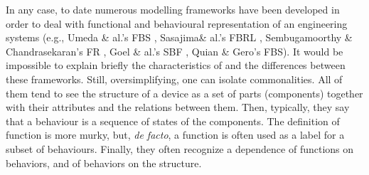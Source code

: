 \documentclass[sw]{iosart2x}
\newcommand{\TODO}[1]{{\color{red} #1}}
\begin{document}
In any case, to date numerous modelling frameworks have been developed in order to deal with functional and behavioural representation of an engineering systems (e.g., Umeda \& al.'s FBS \cite{umedaFunctionBehaviourStructure1990}, Sasajima\& al.'s FBRL \cite{sasajimaFBRLFunctionBehavior1995}, Sembugamoorthy \& Chandrasekaran's FR \cite{sembugamoorthy1986functional}, Goel \& al.'s SBF \cite{goelUseDesignPatterns2004}, Quian \& Gero's FBS).
It would be impossible to explain briefly the characteristics of and the differences between these frameworks. Still, oversimplifying, one can isolate commonalities. All of them tend to see the structure of a device as a set of parts (components) together with their attributes and the relations between them. Then, typically, they say that a behaviour is a sequence of states of the components. The definition of function is more murky, but, \textit{de facto}, a function is often used as a label for a subset of behaviours. Finally, they often recognize a dependence of functions on behaviors, and of behaviors on the structure. 
\end{document}
